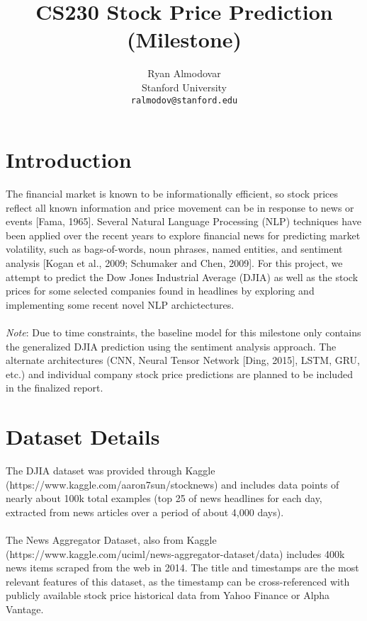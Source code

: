 \documentclass{article} %
\title{CS230 Stock Price Prediction (Milestone)}
\author{
Ryan Almodovar \\
Stanford University\\
\texttt{ralmodov@stanford.edu} \\
}
\begin{document}
\maketitle


\section{Introduction}
The financial market is known to be informationally efficient, so stock prices reflect all known
information and price movement can be in response to news or events [Fama, 1965].  
Several Natural Language Processing (NLP) techniques have been applied over the recent years to explore financial news for predicting market volatility,
such as bags-of-words, noun phrases, named entities, and sentiment analysis [Kogan et al., 2009; Schumaker and Chen, 2009].
For this project, we attempt to predict the Dow Jones Industrial Average (DJIA) as well as the stock prices for some selected companies found in headlines by exploring and implementing some recent novel NLP archictectures.
\\ \\
\textit{Note}: Due to time constraints, the baseline model for this milestone only contains the generalized DJIA prediction using the sentiment analysis approach.
The alternate architectures (CNN, Neural Tensor Network [Ding, 2015], LSTM, GRU, etc.)
and individual company stock price predictions are planned to be included in the finalized report.


\section{Dataset Details}

The DJIA dataset was provided through Kaggle (https://www.kaggle.com/aaron7sun/stocknews) and includes data points of nearly
about 100k total examples (top 25 of news headlines for each day, extracted from news articles over a period of about 4,000 days).
\\ \\
The News Aggregator Dataset, also from Kaggle (https://www.kaggle.com/uciml/news-aggregator-dataset/data)
includes 400k news items scraped from the web in 2014. The title and timestamps are the most relevant features of this dataset,
as the timestamp can be cross-referenced with publicly available stock price historical data from Yahoo Finance or Alpha Vantage.
\end{document}
